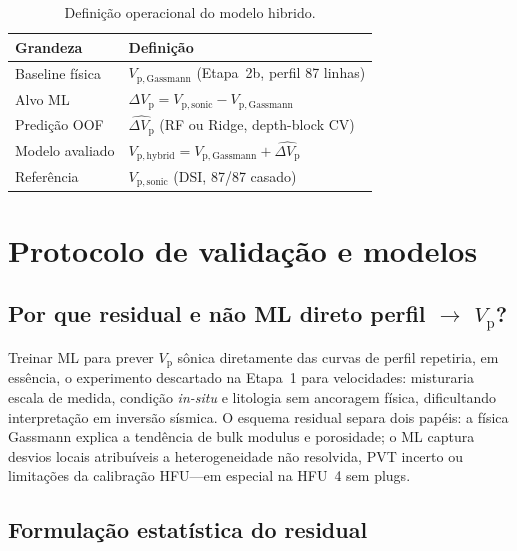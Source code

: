 \documentclass[11pt,a4paper]{article}
\numberwithin{equation}{section}
\newcommand{\Vp}{\ensuremath{V_{\mathrm{p}}}}
\begin{document}
\begin{table}[H]
  \centering
  \caption{Definição operacional do modelo hibrido.}
  \label{tab:hybrid_def}
  \begin{tabular}{ll}
    \toprule
    Grandeza & Definição \\
    \midrule
    Baseline física & $V_{\mathrm{p,Gassmann}}$ (Etapa~2b, perfil 87 linhas) \\
    Alvo ML & $\Delta V_{\mathrm{p}} = V_{\mathrm{p,sonic}} - V_{\mathrm{p,Gassmann}}$ \\
    Predição OOF & $\widehat{\Delta V_{\mathrm{p}}}$ (RF ou Ridge, depth-block CV) \\
    Modelo avaliado & $V_{\mathrm{p,hybrid}} = V_{\mathrm{p,Gassmann}} + \widehat{\Delta V_{\mathrm{p}}}$ \\
    Referência & $V_{\mathrm{p,sonic}}$ (DSI, 87/87 casado) \\
    \bottomrule
  \end{tabular}
\end{table}

\section{Protocolo de validação e modelos}
\label{sec:protocolo}

\subsection{Por que residual e não ML direto perfil $\rightarrow$ \Vp{}?}

Treinar ML para prever \Vp{} sônica diretamente das curvas de perfil
repetiria, em essência, o experimento descartado na Etapa~1 para velocidades:
misturaria escala de medida, condição \emph{in-situ} e litologia sem
ancoragem física, dificultando interpretação em inversão sísmica.
O esquema residual separa dois papéis: a física Gassmann explica a tendência
de bulk modulus e porosidade; o ML captura desvios locais atribuíveis a
heterogeneidade não resolvida, PVT incerto ou limitações da calibração
HFU---em especial na HFU~4 sem plugs.

\subsection{Formulação estatística do residual}
\label{sec:form_estat}
\end{document}
